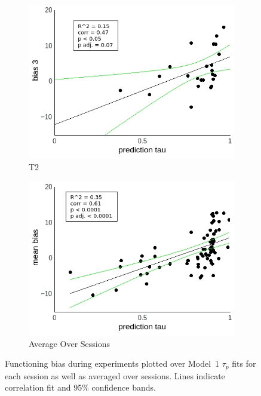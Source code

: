 \documentclass[a4paper]{scrreprt}
\begin{document}
\begin{figure}
\begin{subfigure}[b]{0.49\textwidth}
        \includegraphics[width=\textwidth]{figs/sec3/pred/pred_diff_3_mod1dat.jpeg}
        \caption{T2}
    \end{subfigure}
    \begin{subfigure}[b]{0.49\textwidth}
        \includegraphics[width=\textwidth]{figs/sec3/pred/pred_diff_mean_mod1dat.jpeg}
        \caption{Average Over Sessions}
    \end{subfigure}
\caption{Functioning bias during experiments plotted over Model~1 $\tau_p$ fits for each session as well as averaged over sessions. Lines indicate correlation fit and 95\% confidence bands.}
\label{fig:pred_diff_mod1dat}
\end{figure}
\end{document}
